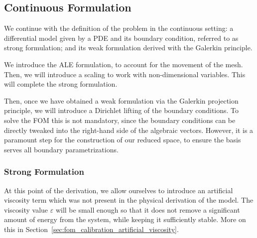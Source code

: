 \documentclass[../../thesis.tex]{subfiles}
\begin{document}
\subsection{Continuous Formulation}
We continue with the definition of the problem in the continuous setting: 
a differential model given by a PDE and its boundary condition, referred to as {strong formulation}; 
and its weak formulation derived with the Galerkin principle.

We introduce the ALE formulation, to account for the movement of the mesh.
Then, we will introduce a scaling to work with non-dimensional variables.
This will complete the strong formulation.

Then, once we have obtained a weak formulation via the Galerkin projection principle,
we will introduce a Dirichlet lifting of the boundary conditions.
To solve the FOM this is not mandatory, since the boundary conditions can be 
directly tweaked into the right-hand side of the algebraic vectors.
However, it is a paramount step for the construction of our reduced space,
to ensure the basis serves all boundary parametrizations.

\subsubsection{Strong Formulation}
At this point of the derivation, we allow ourselves to introduce an artificial viscosity term which was not present in the physical derivation of the model.
The viscosity value $\varepsilon$ will be small enough so that it does not remove a significant amount of energy from the system,
while keeping it sufficiently stable. 
More on this in Section~\ref{sec:fom_calibration_artificial_viscosity}.
\end{document}
